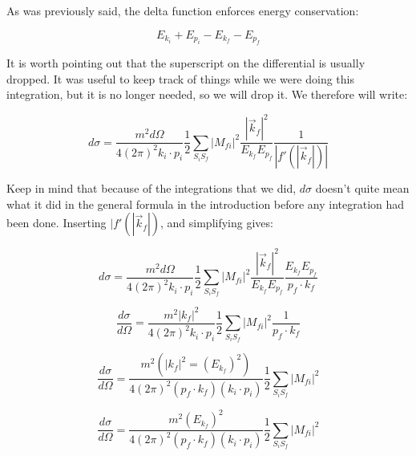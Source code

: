 \documentclass[a4]{article}
\begin{document}
    As was previously said, the delta function enforces energy conservation:

    \begin{equation}
        E_{k_i} + E_{p_i} - E_{k_f} - E_{p_f}
    \end{equation}

    It is worth pointing out that the superscript on the differential is usually dropped. It was useful to keep track of things while we were doing this integration,
    but it is no longer needed, so we will drop it. We therefore will write:

    \begin{equation}
        d \sigma = \frac{m^2 d \Omega}{4 (2 \pi)^2 k_i \cdot p_i} \frac{1}{2} \sum_{S_i S_f} |M_{fi}|^2 \frac{|\vec{k}_f|^2}{E_{k_f} E_{p_f}} \frac{1}{|f'(|\vec{k}_f|)|}
    \end{equation}

    Keep in mind that because of the integrations that we did, $d \sigma$ doesn't quite mean what it did in the general formula in the introduction before any
    integration had been done. Inserting $|f'(|\vec{k}_f|)$, and simplifying gives:

    \begin{equation}
        d \sigma = \frac{m^2 d \Omega}{4 (2 \pi)^2 k_i \cdot p_i} \frac{1}{2} \sum_{S_i S_f} |M_{fi}|^2 \frac{|\vec{k}_f|^2}{E_{k_f} E_{p_f}} \frac{E_{k_f} E_{p_f}}{p_f \cdot k_f}
    \end{equation}

    \begin{equation}
        \frac{d \sigma}{d \Omega} = \frac{m^2 |k_f|^2}{4 (2 \pi)^2 k_i \cdot p_i} \frac{1}{2} \sum_{S_i S_f} |M_{fi}|^2 \frac{1}{p_f \cdot k_f}
    \end{equation}

    \begin{equation}
        \frac{d \sigma}{d \Omega} = \frac{m^2 (|k_f|^2 = (E_{k_f})^2)}{4 (2 \pi)^2 (p_f \cdot k_f) (k_i \cdot p_i)} \frac{1}{2} \sum_{S_i S_f} |M_{fi}|^2
    \end{equation}

    \begin{framed}
        \begin{equation}
            \frac{d \sigma}{d \Omega} = \frac{m^2 (E_{k_f})^2}{4 (2 \pi)^2 (p_f \cdot k_f) (k_i \cdot p_i)} \frac{1}{2} \sum_{S_i S_f} |M_{fi}|^2
        \end{equation}
    \end{framed}
\end{document}
